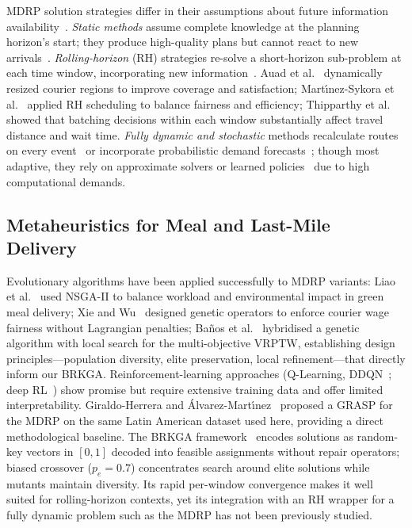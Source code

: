 MDRP solution strategies differ in their assumptions about future
information availability~\cite{reyes2018mdrp}.
\emph{Static methods} assume complete knowledge at the planning
horizon's start; they produce high-quality plans but cannot react
to new arrivals~\cite{dusadeerungsikul2023multiobjective,yildiz2019provably}.
\emph{Rolling-horizon} (RH) strategies re-solve a short-horizon
sub-problem at each time window, incorporating new
information~\cite{reyes2018mdrp,auad2023courier}.
Auad et al.~\cite{auad2023courier} dynamically resized courier
regions to improve coverage and satisfaction;
Mart\'{\i}nez-Sykora et al.~\cite{martinez2024fairness} applied RH
scheduling to balance fairness and efficiency;
Thipparthy et al.~\cite{thipparthy2024optimizing} showed that
batching decisions within each window substantially affect travel
distance and wait time.
\emph{Fully dynamic and stochastic} methods recalculate routes on
every event~\cite{steever2019dynamic} or incorporate probabilistic
demand forecasts~\cite{ulmer2021restaurant}; though most adaptive,
they rely on approximate solvers or learned
policies~\cite{bozanta2022reinforcement} due to high computational
demands.

\subsection{Metaheuristics for Meal and Last-Mile Delivery}
\label{subsec:metaheuristics}

Evolutionary algorithms have been applied successfully to MDRP
variants: Liao et al.~\cite{liao2020multiobjective} used NSGA-II to
balance workload and environmental impact in green meal delivery;
Xie and Wu~\cite{xie2024genetic} designed genetic operators to
enforce courier wage fairness without Lagrangian penalties;
Ba\~{n}os et al.~\cite{banos2013hybrid} hybridised a genetic
algorithm with local search for the multi-objective VRPTW,
establishing design principles—population diversity, elite
preservation, local refinement—that directly inform our BRKGA.
Reinforcement-learning approaches (Q-Learning,
DDQN~\cite{bozanta2022reinforcement}; deep
RL~\cite{ahamed2020deep}) show promise but require extensive
training data and offer limited interpretability.
Giraldo-Herrera and \'Alvarez-Mart\'{\i}nez~\cite{giraldo2024grasp}
proposed a GRASP for the MDRP on the same Latin American dataset
used here, providing a direct methodological baseline.
The BRKGA framework~\cite{goncalves2011brkga,londe2025review}
encodes solutions as random-key vectors in $[0,1]$ decoded into
feasible assignments without repair operators; biased crossover
($p_e=0.7$) concentrates search around elite solutions while
mutants maintain diversity. Its rapid per-window convergence makes
it well suited for rolling-horizon contexts, yet its integration
with an RH wrapper for a fully dynamic problem such as the MDRP
has not been previously studied.

